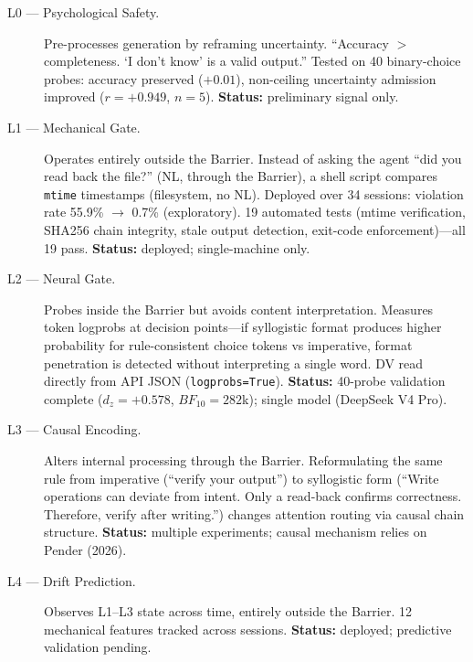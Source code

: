 \documentclass[11pt]{article}
\begin{document}
\begin{description}
\item[L0 --- Psychological Safety.] Pre-processes generation by reframing
  uncertainty. ``Accuracy $>$ completeness. `I don't know' is a valid output.''
  Tested on 40 binary-choice probes: accuracy preserved ($+0.01$),
  non-ceiling uncertainty admission improved ($r=+0.949$, $n=5$).
  \textbf{Status:} preliminary signal only.

\item[L1 --- Mechanical Gate.] Operates entirely outside the Barrier. Instead
  of asking the agent ``did you read back the file?'' (NL, through the Barrier),
  a shell script compares \texttt{mtime} timestamps (filesystem, no NL).
  Deployed over 34 sessions: violation rate 55.9\% $\to$ 0.7\% (exploratory).
  19 automated tests (mtime verification, SHA256 chain integrity, stale output
  detection, exit-code enforcement)---all 19 pass.
  \textbf{Status:} deployed; single-machine only.

\item[L2 --- Neural Gate.] Probes inside the Barrier but avoids content
  interpretation. Measures token logprobs at decision points---if syllogistic
  format produces higher probability for rule-consistent choice tokens vs
  imperative, format penetration is detected without interpreting a single word.
  DV read directly from API JSON (\texttt{logprobs=True}).
  \textbf{Status:} 40-probe validation complete ($d_z=+0.578$, $BF_{10}=282$k);
  single model (DeepSeek V4 Pro).

\item[L3 --- Causal Encoding.] Alters internal processing through the Barrier.
  Reformulating the same rule from imperative (``verify your output'') to
  syllogistic form (``Write operations can deviate from intent. Only a read-back
  confirms correctness. Therefore, verify after writing.'') changes attention
  routing via causal chain structure.
  \textbf{Status:} multiple experiments; causal mechanism relies on Pender (2026).

\item[L4 --- Drift Prediction.] Observes L1--L3 state across time, entirely
  outside the Barrier. 12 mechanical features tracked across sessions.
  \textbf{Status:} deployed; predictive validation pending.
\end{description}
\end{document}
